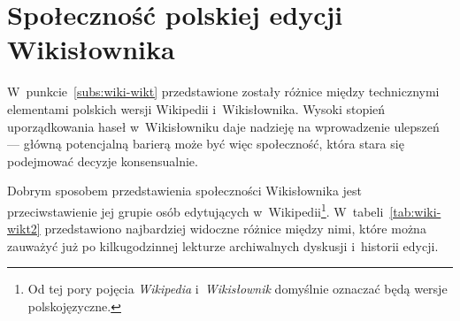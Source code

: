 \section{Społeczność polskiej edycji Wikisłownika}
\label{sec:plsoc}
W~punkcie~\ref{subs:wiki-wikt} przedstawione zostały różnice między technicznymi elementami polskich wersji Wikipedii i~Wikisłownika. Wysoki stopień uporządkowania haseł w~Wikisłowniku daje nadzieję na wprowadzenie ulepszeń --- główną potencjalną barierą może być więc społeczność, która stara się podejmować decyzje konsensualnie.

Dobrym sposobem przedstawienia społeczności Wikisłownika jest przeciwstawienie jej grupie osób edytujących w~Wikipedii\footnote{Od tej pory pojęcia \emph{Wikipedia} i~\emph{Wikisłownik} domyślnie oznaczać będą wersje polskojęzyczne.}. W~tabeli~\ref{tab:wiki-wikt2} przedstawiono najbardziej widoczne różnice między nimi, które można zauważyć już po kilkugodzinnej lekturze archiwalnych dyskusji i~historii edycji.


